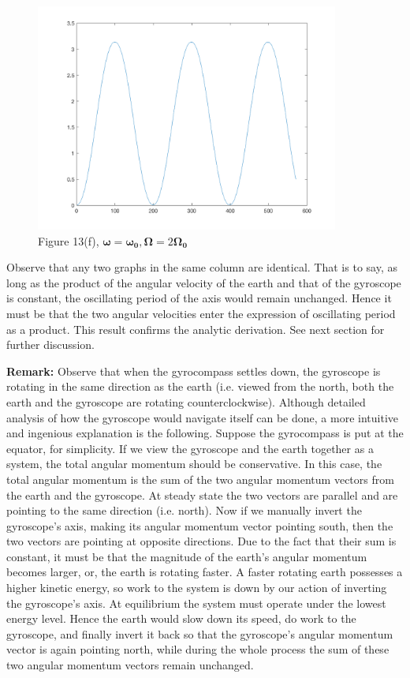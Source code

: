 \documentclass[12pt]{article}
\renewcommand{\(}{\left (}
\renewcommand{\)}{\right )}
\renewcommand{\vec}[1]{\boldsymbol{#1}}
\begin{document}
\begin{figure}[h]
\begin{minipage}{0.33\textwidth}
		\includegraphics[width=0.89\textwidth]{E2000.png}
		\caption*{\small Figure 13(f), $\vec{\omega} = \vec{\omega_0}, \vec{\Omega} = {2}\vec{\Omega_0}$}
	\end{minipage}
\end{figure}


Observe that any two graphs in the same column are identical. That is to say, as long as the product of the angular velocity of the earth and that of the gyroscope is constant, the oscillating period of the axis would remain unchanged. Hence it must be that the two angular velocities enter the expression of oscillating period as a product. This result confirms the analytic derivation. See next section for further discussion.

\textbf{Remark:} Observe that when the gyrocompass settles down, the gyroscope is rotating in the same direction as the earth (i.e. viewed from the north, both the earth and the gyroscope are rotating counterclockwise). Although detailed analysis of how the gyroscope would navigate itself can be done, a more intuitive and ingenious explanation is the following. Suppose the gyrocompass is put at the equator, for simplicity. If we view the gyroscope and the earth together as a system, the total angular momentum should be conservative. In this case, the total angular momentum is the sum of the two angular momentum vectors from the earth and the gyroscope. At steady state the two vectors are parallel and are pointing to the same direction (i.e. north). Now if we manually invert the gyroscope's axis, making its angular momentum vector pointing south, then the two vectors are pointing at opposite directions. Due to the fact that their sum is constant, it must be that the magnitude of the earth's angular momentum becomes larger, or, the earth is rotating faster. A faster rotating earth possesses a higher kinetic energy, so work to the system is down by our action of inverting the gyroscope's axis. At equilibrium the system must operate under the lowest energy level. Hence the earth would slow down its speed, do work to the gyroscope, and finally invert it back so that the gyroscope's angular momentum vector is again pointing north, while during the whole process the sum of these two angular momentum vectors remain unchanged.
\end{document}
